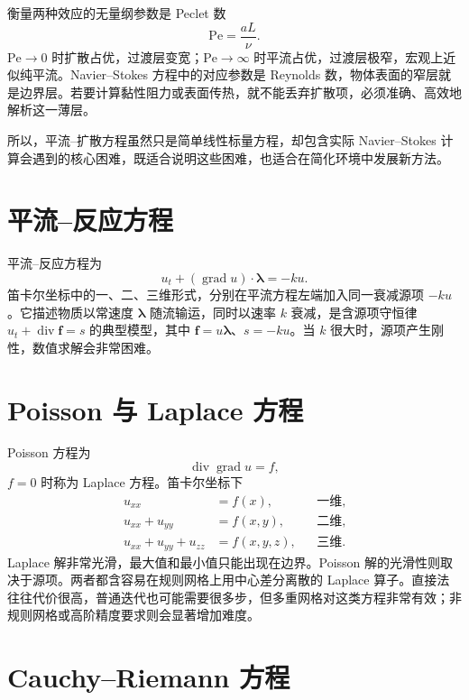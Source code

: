 \documentclass[11pt,a4paper,openany,fontset=none]{ctexbook}
\begin{document}
衡量两种效应的无量纲参数是 Peclet 数
\begin{equation}
 \mathrm{Pe}=\frac{aL}{\nu}. \tag{2.6.12}
\end{equation}
$\mathrm{Pe}\to0$ 时扩散占优，过渡层变宽；$\mathrm{Pe}\to\infty$ 时平流占优，过渡层极窄，宏观上近似纯平流。Navier--Stokes 方程中的对应参数是 Reynolds 数，物体表面的窄层就是边界层。若要计算黏性阻力或表面传热，就不能丢弃扩散项，必须准确、高效地解析这一薄层。

所以，平流--扩散方程虽然只是简单线性标量方程，却包含实际 Navier--Stokes 计算会遇到的核心困难，既适合说明这些困难，也适合在简化环境中发展新方法。

\section{平流--反应方程}

平流--反应方程为
\begin{equation}
 u_t+(\operatorname{grad}u)\cdot\bm\lambda=-ku. \tag{2.7.1}
\end{equation}
笛卡尔坐标中的一、二、三维形式，分别在平流方程左端加入同一衰减源项 $-ku$。它描述物质以常速度 $\bm\lambda$ 随流输运，同时以速率 $k$ 衰减，是含源项守恒律 $u_t+\operatorname{div}\bm f=s$ 的典型模型，其中 $\bm f=u\bm\lambda$、$s=-ku$。当 $k$ 很大时，源项产生刚性，数值求解会非常困难。

\section{Poisson 与 Laplace 方程}

Poisson 方程为
\begin{equation}
 \operatorname{div}\operatorname{grad}u=f, \tag{2.8.1}
\end{equation}
$f=0$ 时称为 Laplace 方程。笛卡尔坐标下
\begin{align}
 u_{xx}&=f(x), &&\text{一维},\\
 u_{xx}+u_{yy}&=f(x,y), &&\text{二维},\\
 u_{xx}+u_{yy}+u_{zz}&=f(x,y,z), &&\text{三维}. \tag{2.8.2--4}
\end{align}
Laplace 解非常光滑，最大值和最小值只能出现在边界。Poisson 解的光滑性则取决于源项。两者都含容易在规则网格上用中心差分离散的 Laplace 算子。直接法往往代价很高，普通迭代也可能需要很多步，但多重网格对这类方程非常有效；非规则网格或高阶精度要求则会显著增加难度。

\section{Cauchy--Riemann 方程}
\end{document}
